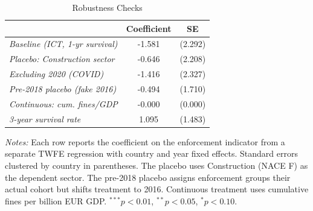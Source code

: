 \begin{table}[t]
\centering
\caption{Robustness Checks}
\label{tab:robust}
\begin{tabular}{lcc}
\hline\hline
 & Coefficient & SE \\
\hline
\textit{Baseline (ICT, 1-yr survival)} & -1.581 & (2.292) \\
\textit{Placebo: Construction sector} & -0.646 & (2.208) \\
\textit{Excluding 2020 (COVID)} & -1.416 & (2.327) \\
\textit{Pre-2018 placebo (fake 2016)} & -0.494 & (1.710) \\
\textit{Continuous: cum. fines/GDP} & -0.000 & (0.000) \\
\textit{3-year survival rate} & 1.095 & (1.483) \\
\hline\hline
\end{tabular}
\par\vspace{0.3em}\begin{flushleft}\small
\textit{Notes:} Each row reports the coefficient on the enforcement indicator from a separate TWFE regression with country and year fixed effects. Standard errors clustered by country in parentheses. The placebo uses Construction (NACE F) as the dependent sector. The pre-2018 placebo assigns enforcement groups their actual cohort but shifts treatment to 2016. Continuous treatment uses cumulative fines per billion EUR GDP. $^{***}p<0.01$, $^{**}p<0.05$, $^{*}p<0.10$.
\end{flushleft}
\end{table}


